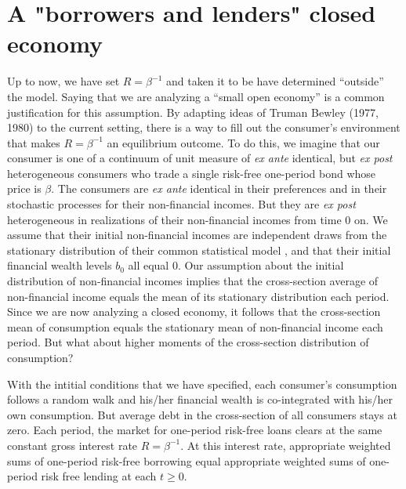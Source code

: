 \section{A "borrowers and lenders" closed economy}\label{sec:borrowlender}%
Up to now, we have set $R = \beta^{-1}$  and  taken it to be have  
determined ``outside'' the model.  Saying that we are analyzing a ``small open economy''  is a common justification  for this assumption.
%
By adapting ideas of   Truman Bewley (1977, 1980) to the current setting, there is a way to fill out 
the  consumer's environment  that makes  $R = \beta^{-1}$ an equilibrium outcome.  
To do this, we imagine that our consumer is one of a  continuum of unit measure of  {\it ex ante} identical, but {\it ex post} heterogeneous consumers who trade a single risk-free one-period bond whose price is $\beta$.  
The consumers are {\it ex ante} identical in their preferences and in their stochastic processes for 
their non-financial incomes.  But they are {\it ex post} heterogeneous in  realizations of their non-financial incomes from time $0$ on.  We assume that their initial
non-financial incomes are independent draws from the stationary distribution  of their common statistical model , and that their initial financial wealth levels $b_0$  all equal  $0$. Our assumption about the initial distribution of non-financial incomes implies that the cross-section average of non-financial income equals the mean of its  stationary distribution each period.   
Since we are now analyzing a closed economy, it follows that the cross-section mean of consumption equals the stationary mean of non-financial income each period. 
But what about higher moments of the cross-section distribution of consumption? 


With the intitial conditions that we have specified, each consumer's consumption follows a random walk and his/her financial wealth is co-integrated with his/her own consumption. But average debt in the cross-section of all consumers stays at zero.   Each period, the market for one-period risk-free loans clears at the same 
constant gross interest rate $R = \beta^{-1}$. At this interest rate,  appropriate weighted sums of one-period risk-free borrowing equal  appropriate weighted sums of one-period risk free lending at each $t \geq 0$. 


